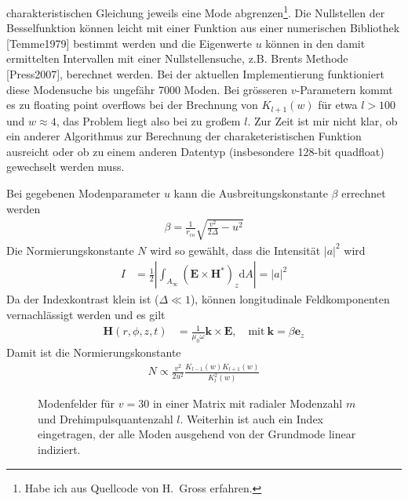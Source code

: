 \documentclass[DIV19,twocolumn]{scrartcl}
\newcommand{\vect}[1]{\mathbf{#1}}
\def\k{\vect k}
\def\e{\vect e}
\def\E{\vect E}
\def\H{\vect H}
\def\({\left(}
\def\){\right)}
\newcommand{\rco}{r_\textrm{co}}
\def\svgending{\ifx\pdfoutput\undefined%
  .eps_tex%
  \else%
  .pdf_tex%
  \fi}
\newcommand{\svginput}[2]{{\def\svgscale{#1}}}
\begin{document}
charakteristischen Gleichung jeweils eine Mode abgrenzen\footnote{Habe
  ich aus Quellcode von H.~Gross erfahren.}. Die Nullstellen der
Besselfunktion k\"onnen leicht mit einer Funktion aus einer
numerischen Bibliothek [Temme1979] bestimmt werden und die Eigenwerte
$u$ k\"onnen in den damit ermittelten Intervallen mit einer
Nullstellensuche, z.B. Brents Methode [Press2007], berechnet werden.
Bei der aktuellen Implementierung funktioniert diese Modensuche bis
ungef\"ahr 7000 Moden. Bei gr\"osseren $v$-Parametern kommt es zu
floating point overflows bei der Brechnung von $K_{l+1}(w)$ f\"ur etwa
$l>100$ und $w\approx 4$, das Problem liegt also bei zu gro\ss em
$l$. Zur Zeit ist mir nicht klar, ob ein anderer Algorithmus zur
Berechnung der charaketeristischen Funktion ausreicht oder ob zu einem
anderen Datentyp (insbesondere 128-bit quadfloat) gewechselt werden
muss.


Bei gegebenen Modenparameter $u$ kann die Ausbreitungskonstante
$\beta$ errechnet werden
\begin{align}
\beta = \frac{1}{\rco} \sqrt{\frac{v^2}{2\Delta} - u^2}
\end{align}
Die Normierungskonstante $N$ wird so gew\"ahlt, dass die Intensit\"at
$|a|^2$ wird
\begin{align}
  I &= \frac{1}{2}\left|\int_{A_\infty}\!\!\!\!\! \(\E\times\H^*\)_z  \textrm{d}A \right| = |a|^2
\end{align}
Da der Indexkontrast klein ist ($\Delta \ll 1$), k\"onnen longitudinale Feldkomponenten vernachl\"assigt werden und es gilt
\begin{align}
  \H(r,\phi,z,t) &= \frac{1}{\mu_0 \omega} \k \times \E, \quad\textrm{mit}\ \k = \beta \e_z
\end{align}
Damit ist die Normierungskonstante 
\begin{align}
  N \propto \frac{v^2}{2 u^2} \frac{K_{l-1}(w)K_{l+1}(w)}{K_l^2(w)}
\end{align}

\begin{figure}[hbtp]
  \centering
  \svginput{1}{modes}
  \caption{Modenfelder f\"ur $v=30$ in einer Matrix mit radialer
    Modenzahl $m$ und Drehimpulsquantenzahl $l$. Weiterhin ist auch
    ein Index eingetragen, der alle Moden ausgehend von der Grundmode
    linear indiziert.}
  \label{fig:fields}
\end{figure}
\end{document}
